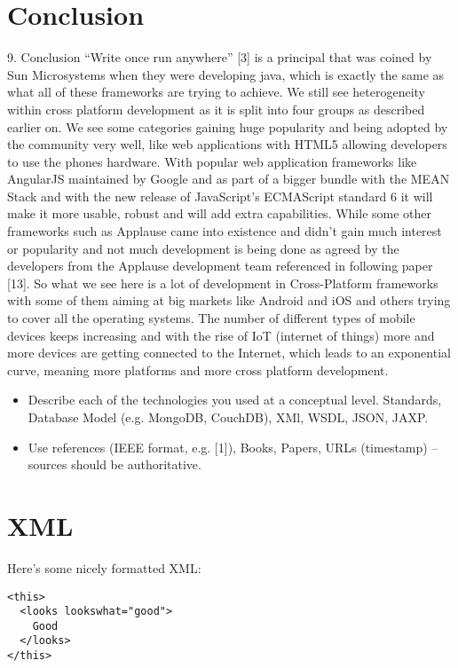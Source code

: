\section{ Conclusion}
9. Conclusion
“Write once run anywhere” [3] is a principal that was coined by Sun
Microsystems when they were developing java, which is exactly the same as
what all of these frameworks are trying to achieve. We still see heterogeneity
within cross platform development as it is split into four groups as described
earlier on. We see some categories gaining huge popularity and being
adopted by the community very well, like web applications with HTML5
allowing developers to use the phones hardware. With popular web
application frameworks like AngularJS maintained by Google and as part of a
bigger bundle with the MEAN Stack and with the new release of JavaScript’s
ECMAScript standard 6 it will make it more usable, robust and will add extra
capabilities. While some other frameworks such as Applause came into
existence and didn’t gain much interest or popularity and not much
development is being done as agreed by the developers from the Applause
development team referenced in following paper [13]. So what we see here
is a lot of development in Cross-Platform frameworks with some of them
aiming at big markets like Android and iOS and others trying to cover all the
operating systems. The number of different types of mobile devices keeps
increasing and with the rise of IoT (internet of things) more and more devices
are getting connected to the Internet, which leads to an exponential curve,
meaning more platforms and more cross platform development.

\begin{itemize}
\item Describe each of the technologies you used at a conceptual level. Standards, Database Model (e.g. MongoDB, CouchDB), XMl, WSDL, JSON, JAXP.
\item Use references (IEEE format, e.g. [1]), Books, Papers, URLs (timestamp) – sources should be authoritative. 
\end{itemize}

\section{XML}
Here's some nicely formatted XML:
\begin{verbatim}
<this>
  <looks lookswhat="good">
    Good
  </looks>
</this>
\end{verbatim}

